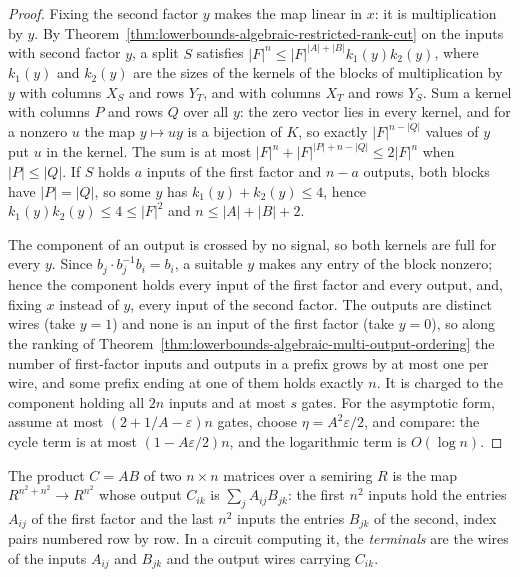 \begin{proof}
  \leanok
  Fixing the second factor $y$ makes the map linear in $x$: it is
  multiplication by $y$. By
  Theorem~\ref{thm:lowerbounds-algebraic-restricted-rank-cut} on the inputs
  with second factor $y$, a split $S$ satisfies
  $|F|^n\le|F|^{|A|+|B|}k_1(y)k_2(y)$, where $k_1(y)$ and $k_2(y)$ are the
  sizes of the kernels of the blocks of multiplication by $y$ with columns
  $X_S$ and rows $Y_T$, and with columns $X_T$ and rows $Y_S$. Sum a kernel
  with columns $P$ and rows $Q$ over all $y$: the zero vector lies in every
  kernel, and for a nonzero $u$ the map $y\mapsto uy$ is a bijection of $K$,
  so exactly $|F|^{n-|Q|}$ values of $y$ put $u$ in the kernel. The sum is
  at most $|F|^n+|F|^{|P|+n-|Q|}\le2|F|^n$ when $|P|\le|Q|$. If $S$ holds
  $a$ inputs of the first factor and $n-a$ outputs, both blocks have
  $|P|=|Q|$, so some $y$ has $k_1(y)+k_2(y)\le4$, hence $k_1(y)k_2(y)\le
  4\le|F|^2$ and $n\le|A|+|B|+2$.

  The component of an output is crossed by no signal, so both kernels are
  full for every $y$. Since $b_j\cdot b_j^{-1}b_i=b_i$, a suitable $y$ makes
  any entry of the block nonzero; hence the component holds every input of
  the first factor and every output, and, fixing $x$ instead of $y$, every
  input of the second factor. The outputs are distinct wires (take $y=1$)
  and none is an input of the first factor (take $y=0$), so along the
  ranking of Theorem~\ref{thm:lowerbounds-algebraic-multi-output-ordering}
  the number of first-factor inputs and outputs in a prefix grows by at most
  one per wire, and some prefix ending at one of them holds exactly $n$. It
  is charged to the component holding all $2n$ inputs and at most $s$
  gates. For the asymptotic form, assume at most $(2+1/A-\varepsilon)n$
  gates, choose $\eta=A^2\varepsilon/2$, and compare: the cycle term is at
  most $(1-A\varepsilon/2)n$, and the logarithmic term is $O(\log n)$.
\end{proof}

\begin{definition}
  \label{def:lowerbounds-algebraic-mat-mul}
  \leanok
  The product $C=AB$ of two $n\times n$ matrices over a semiring $R$ is the
  map $R^{n^2+n^2}\to R^{n^2}$ whose output $C_{ik}$ is
  $\sum_jA_{ij}B_{jk}$: the first $n^2$ inputs hold the entries $A_{ij}$ of
  the first factor and the last $n^2$ inputs the entries $B_{jk}$ of the
  second, index pairs numbered row by row. In a circuit computing it, the
  \emph{terminals} are the wires of the inputs $A_{ij}$ and $B_{jk}$ and the
  output wires carrying $C_{ik}$.
\end{definition}

